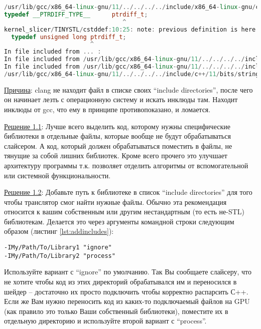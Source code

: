 \documentclass[11pt,fleqn,english,russian]{report} %
\begin{document}
\begin{lstlisting}[language=C++, 
	caption=ошибка из-за ненайденного файла bitset из STL, 
	label=lst:filenotfound]	
/usr/lib/gcc/x86_64-linux-gnu/11/../../../../include/x86_64-linux-gnu/c++/11/bits/c++config.h:281:28: error: typedef redefinition with different types ('long' vs 'unsigned long')
typedef __PTRDIFF_TYPE__      ptrdiff_t;
                                 ^
kernel_slicer/TINYSTL/cstddef:10:25: note: previous definition is here
  typedef unsigned long ptrdiff_t;
                        ^
In file included from ... :
In file included from /usr/lib/gcc/x86_64-linux-gnu/11/../../../../include/c++/11/bitset:50:
In file included from /usr/lib/gcc/x86_64-linux-gnu/11/../../../../include/c++/11/iosfwd:39:
/usr/lib/gcc/x86_64-linux-gnu/11/../../../../include/c++/11/bits/stringfwd.h:79:33: error: typedef redefinition with different types ('basic_string<char>' vs 'str::string_base<char>')
\end{lstlisting}

\noindent\underline{Причина}: clang не находит файл в списке своих ``include directories'', после чего он начинает лезть с операционную систему и искать инклюды там. Находит инклюды от gcc, что ему в принципе противопоказано, и ломается. 

\vspace*{5px}
\noindent\underline{Решение 1.1}: Лучше всего выделить код, которому нужны специфические библиотеки в отдельные файлы, которые вообще не будут обрабатываться слайсером. А код, который должен обрабатываться поместить в файлы, не тянущие за собой лишних библиотек. Кроме всего прочего это улучшает архитектуру программы т.к. позволяет отделить алгоритмы от вспомогательной или системной функциональности.

\vspace*{5px}
\noindent\underline{Решение 1.2}: Добавьте путь к библиотеке в список ``include directories'' для того чтобы транслятор смог найти нужные файлы. Обычно эта рекомендация относится к вашим собственным или другим нестандартным (то есть не-STL) библиотекам. Делается это через аргументы командной строки следующим образом (листинг \ref{lst:addincludes}):

\begin{lstlisting}[caption=добавляем новый подключаемый файл, 
	label=lst:addincludes]	
-IMy/Path/To/Library1 "ignore"
-IMy/Path/To/Library2 "process"
\end{lstlisting}

Используйте вариант с ``ignore'' по умолчанию. Так Вы сообщаете слайсеру, что не хотите чтобы код из этих директорий обрабатывался им и переносился в шейдер -- достаточно их просто подключить чтобы корректно распарсить С++. Если же Вам нужно переносить код из каких-то подключаемый файлов на GPU (как правило это только Ваши собственный библиотеки), поместите их в отдельную директорию и используйте второй вариант с ``process''.
\end{document}
